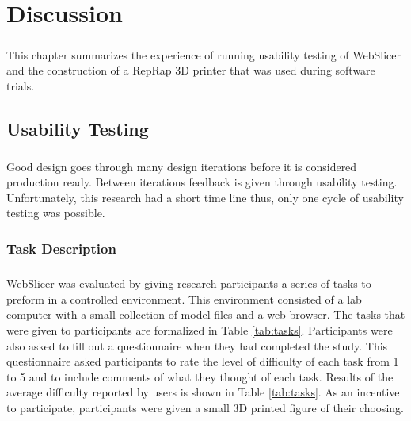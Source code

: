 \chapter{Discussion}
\paragraph{}
This chapter summarizes the experience of running usability testing of WebSlicer and the construction of a RepRap 3D printer that was used during software trials.

\section{Usability Testing}
\paragraph{}
Good design goes through many design iterations before it is considered production ready. 
Between iterations feedback is given through usability testing. 
Unfortunately, this research had a short time line thus, only one cycle of usability testing was possible.

\subsection{Task Description}
\paragraph{}
WebSlicer was evaluated by giving research participants a series of tasks to preform in a controlled environment.
This environment consisted of a lab computer with a small collection of model files and a web browser.
The tasks that were given to participants are formalized in Table \ref{tab:tasks}.
Participants were also asked to fill out a questionnaire when they had completed the study.
This questionnaire asked participants to rate the level of difficulty of each task from 1 to 5 and to include comments of what they thought of each task.
Results of the average difficulty reported by users is shown in Table \ref{tab:tasks}.
As an incentive to participate, participants were given a small 3D printed figure of their choosing.

